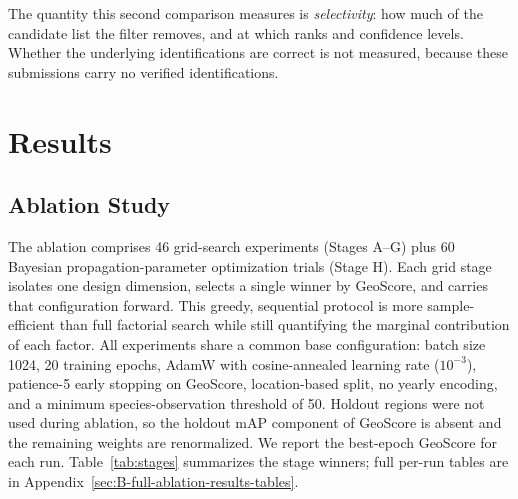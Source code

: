 The quantity this second comparison measures is \emph{selectivity}: how much of the candidate list the filter removes, and at which ranks and confidence levels. Whether the underlying identifications are correct is not measured, because these submissions carry no verified identifications.


\section{Results}
\label{sec:results}

\subsection{Ablation Study}
\label{sec:res-ablation}

The ablation comprises 46 grid-search experiments (Stages A--G) plus 60 Bayesian propagation-parameter optimization trials (Stage H). Each grid stage isolates one design dimension, selects a single winner by GeoScore, and carries that configuration forward. This greedy, sequential protocol is more sample-efficient than full factorial search while still quantifying the marginal contribution of each factor. All experiments share a common base configuration: batch size 1024, 20 training epochs, AdamW with cosine-annealed learning rate ($10^{-3}$), patience-5 early stopping on GeoScore, location-based split, no yearly encoding, and a minimum species-observation threshold of 50. Holdout regions were not used during ablation, so the holdout mAP component of GeoScore is absent and the remaining weights are renormalized. We report the best-epoch GeoScore for each run. Table~\ref{tab:stages} summarizes the stage winners; full per-run tables are in Appendix~\ref{sec:B-full-ablation-results-tables}.

